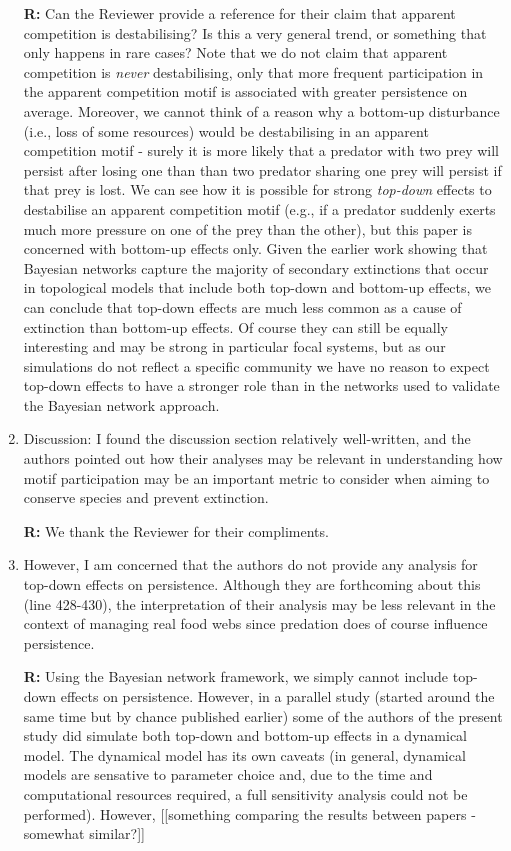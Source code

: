 \documentclass[12pt]{article}
\begin{document}
\begin{enumerate}
                \textbf{R:} Can the Reviewer provide a reference for their claim that apparent competition is destabilising? Is this a very general trend, or something that only happens in rare cases? Note that we do not claim that apparent competition is \emph{never} destabilising, only that more frequent participation in the apparent competition motif is associated with greater persistence on average. Moreover, we cannot think of a reason why a bottom-up disturbance (i.e., loss of some resources) would be destabilising in an apparent competition motif - surely it is more likely that a predator with two prey will persist after losing one than than two predator sharing one prey will persist if that prey is lost. We can see how it is possible for strong \emph{top-down} effects to destabilise an apparent competition motif (e.g., if a predator suddenly exerts much more pressure on one of the prey than the other), but this paper is concerned with bottom-up effects only. Given the earlier work showing that Bayesian networks capture the majority of secondary extinctions that occur in topological models that include both top-down and bottom-up effects, we can conclude that top-down effects are much less common as a cause of extinction than bottom-up effects. Of course they can still be equally interesting and may be strong in particular focal systems, but as our simulations do not reflect a specific community we have no reason to expect top-down effects to have a stronger role than in the networks used to validate the Bayesian network approach.


            \item Discussion: I found the discussion section relatively well-written, and the authors pointed out how their analyses may be relevant in understanding how motif participation may be an important metric to consider when aiming to conserve species and prevent extinction.

                \textbf{R:} We thank the Reviewer for their compliments.


            \item However, I am concerned that the authors do not provide any analysis for top-down effects on persistence. Although they are forthcoming about this (line 428-430), the interpretation of their analysis may be less relevant in the context of managing real food webs since predation does of course influence persistence.

                \textbf{R:} Using the Bayesian network framework, we simply cannot include top-down effects on persistence. However, in a parallel study (started around the same time but by chance published earlier) some of the authors of the present study did simulate both top-down and bottom-up effects in a dynamical model. The dynamical model has its own caveats (in general, dynamical models are sensative to parameter choice and, due to the time and computational resources required, a full sensitivity analysis could not be performed). However, [[something comparing the results between papers - somewhat similar?]]



\end{enumerate}
\end{document}
